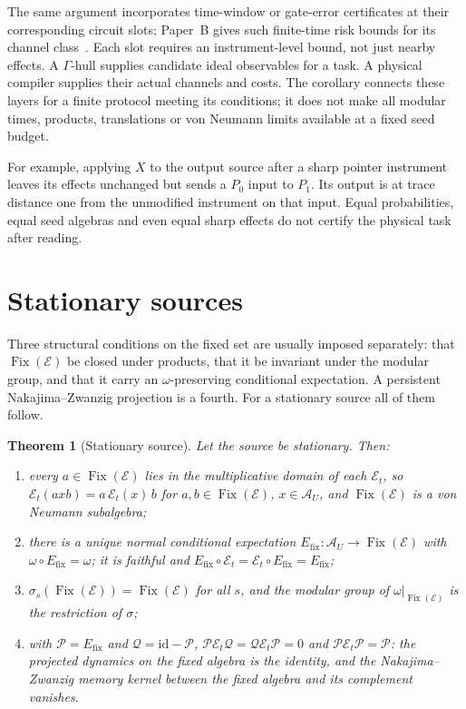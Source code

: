 \documentclass[12pt]{article}
\newtheorem{theorem}{Theorem}[section]
\theoremstyle{definition}
\theoremstyle{remark}
\newcommand{\Fix}{\operatorname{Fix}}
\newcommand{\AU}{\mathcal A_U}
\begin{document}
The same argument incorporates time-window or gate-error certificates
at their corresponding circuit slots; Paper~B gives such finite-time
risk bounds for its channel class~\cite{HAFFB}. Each slot requires an
instrument-level bound, not just nearby effects. A \(\Gamma\)-hull supplies
candidate ideal observables for a task. A physical compiler supplies
their actual channels and costs. The corollary connects these layers for
a finite protocol meeting its conditions; it does not make all modular
times, products, translations or von Neumann limits available at a
fixed seed budget.

For example, applying \(X\) to the output source after a sharp pointer
instrument leaves its effects unchanged but sends a \(P_0\) input to
\(P_1\). Its output is at trace distance one from the unmodified
instrument on that input. Equal probabilities, equal seed algebras and
even equal sharp effects do not certify the physical task after reading.

\section{Stationary sources}\label{sec:stationary}

Three structural conditions on the fixed set are usually imposed separately: that
\(\Fix(\mathcal E)\) be closed under products, that it be invariant under the modular
group, and that it carry an \(\omega\)-preserving conditional expectation. A
persistent Nakajima--Zwanzig projection is a fourth. For a stationary source all of
them follow.

\begin{theorem}[Stationary source]\label{thm:stationary}
Let the source be stationary. Then:
\begin{enumerate}[label=(\alph*),leftmargin=2em]
\item every \(a\in\Fix(\mathcal E)\) lies in the multiplicative domain of each
  \(\mathcal E_t\), so \(\mathcal E_t(axb)=a\,\mathcal E_t(x)\,b\) for
  \(a,b\in\Fix(\mathcal E)\), \(x\in\AU\), and \(\Fix(\mathcal E)\) is a von Neumann
  subalgebra;
\item there is a unique normal conditional expectation
  \(E_{\mathrm{fix}}:\AU\to\Fix(\mathcal E)\) with \(\omega\circ E_{\mathrm{fix}}=\omega\);
  it is faithful and
  \(E_{\mathrm{fix}}\circ\mathcal E_t=\mathcal E_t\circ E_{\mathrm{fix}}=E_{\mathrm{fix}}\);
\item \(\sigma_s(\Fix(\mathcal E))=\Fix(\mathcal E)\) for all \(s\), and the modular
  group of \(\omega|_{\Fix(\mathcal E)}\) is the restriction of \(\sigma\);
\item with \(\mathcal P=E_{\mathrm{fix}}\) and \(\mathcal Q=\mathrm{id}-\mathcal P\),
  \(\mathcal P\mathcal E_t\mathcal Q=\mathcal Q\mathcal E_t\mathcal P=0\) and
  \(\mathcal P\mathcal E_t\mathcal P=\mathcal P\): the projected dynamics on the fixed
  algebra is the identity, and the Nakajima--Zwanzig memory kernel between the fixed
  algebra and its complement vanishes.
\end{enumerate}
\end{theorem}
\end{document}
